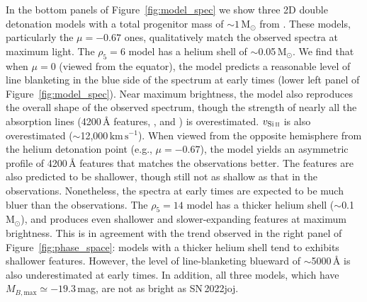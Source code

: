\documentclass[twocolumn]{aastex631}
\newcommand{\sn}{SN\,2022joj}
\newcommand{\kms}{$\mathrm{km}\,\mathrm{s}^{-1}$}
\begin{document}
\begin{CJK*}{UTF8}{gbsn}
In the bottom panels of Figure~\ref{fig:model_spec} we show three 2D double detonation models with a total progenitor mass of $\sim$$1\,\mathrm{M_\odot}$ from \citet{Shen_2D_2021}. These models, particularly the $\mu = -0.67$ ones, qualitatively match the observed spectra at maximum light. The $\rho_5=6$ model has a helium shell of $\sim$0.05$\,\mathrm{M_\odot}$. We find that when $\mu=0$ (viewed from the equator), the model predicts a reasonable level of line blanketing in the blue side of the spectrum at early times (lower left panel of Figure~\ref{fig:model_spec}). Near maximum brightness, the model also reproduces the overall shape of the observed spectrum, though the strength of nearly all the absorption lines (4200\,\r{A} features, , and ) is overestimated. $v_\mathrm{Si\,\textsc{ii}}$ is also overestimated ($\sim$12,000\,\kms). When viewed from the opposite hemisphere from the helium detonation point (e.g., $\mu=-0.67$), the model yields an asymmetric profile of 4200\,\r{A} features that matches the observations better. The  features are also predicted to be shallower, though still not as shallow as that in the observations. Nonetheless, the spectra at early times are expected to be much bluer than the observations. The $\rho_5=14$ model has a thicker helium shell ($\sim$0.1\,$\mathrm{M_\odot}$), and produces even shallower and slower-expanding  features at maximum brightness. This is in agreement with the trend observed in the right panel of Figure~\ref{fig:phase_space}: models with a thicker helium shell tend to exhibits shallower  features. However, the level of line-blanketing blueward of $\sim$5000\,\r{A} is also underestimated at early times. In addition, all three models, which have $M_{B,\mathrm{max}}\simeq -19.3$\,mag, are not as bright as \sn. 


\end{CJK*}
\end{document}

